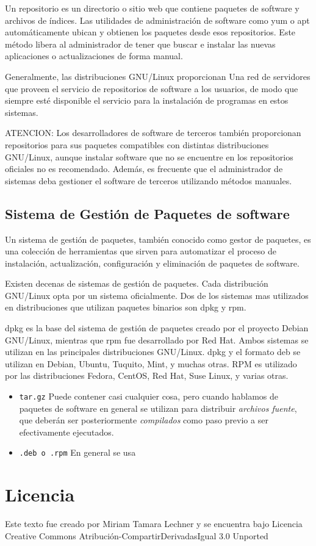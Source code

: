 \documentclass[12pt]{article}
\begin{document}
Un repositorio es un directorio o sitio web que contiene paquetes de software y archivos de índices. 
Las utilidades de administración de software como yum o apt automáticamente ubican y obtienen 
los paquetes desde esos repositorios. Este método libera al administrador de tener que buscar e instalar las nuevas aplicaciones o actualizaciones de forma manual. 

Generalmente, las distribuciones GNU/Linux proporcionan Una red de servidores que proveen 
el servicio de repositorios de software a los usuarios, de modo que siempre
esté disponible el servicio para la instalación de programas en estos sistemas.

ATENCION: Los desarrolladores de software de terceros también proporcionan repositorios
para sus paquetes compatibles 
con distintas distribuciones GNU/Linux, aunque instalar software que no se encuentre en los 
repositorios oficiales no es recomendado. Además, es frecuente que el administrador
de sistemas deba gestioner el software de terceros utilizando métodos manuales.

\subsection*{Sistema de Gestión de Paquetes de software}

Un sistema de gestión de paquetes, también conocido como gestor de paquetes, es una colección de herramientas que sirven para automatizar el proceso de instalación, actualización, configuración y eliminación de paquetes de software.

Existen decenas de sistemas de gestión de paquetes. Cada distribución GNU/Linux opta 
por un sistema oficialmente. Dos de los sistemas mas utilizados en distribuciones
que utilizan paquetes binarios son dpkg y rpm.

dpkg es la base del sistema de gestión de paquetes creado por el proyecto Debian GNU/Linux, mientras que rpm
fue desarrollado por Red Hat.
Ambos sistemas se utilizan en las principales distribuciones GNU/Linux. dpkg y el formato
deb se utilizan en Debian, Ubuntu, Tuquito, Mint, y muchas otras. RPM es utilizado por
las distribuciones Fedora, CentOS, Red Hat, Suse Linux, y varias otras.

\begin{itemize}
\item \texttt{tar.gz} Puede contener casi cualquier cosa, pero cuando hablamos
de paquetes de software en general se utilizan para distribuir \textit{archivos
fuente}, que deberán ser posteriormente \textit{compilados} como paso previo 
a ser efectivamente ejecutados. 
\item \texttt{.deb o .rpm} En general se usa
\end{itemize}


\section*{Licencia}

Este texto fue creado por Miriam Tamara Lechner y se encuentra bajo 
Licencia Creative Commons Atribución-CompartirDerivadasIgual 3.0 Unported
\end{document}
